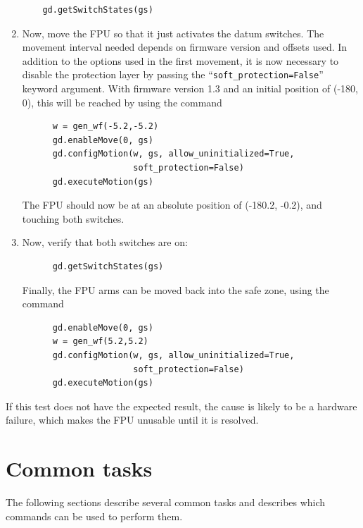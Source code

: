\documentclass[fontsize=12,a4paper]{scrreprt}
\begin{document}
\begin{enumerate}
  \begin{verbatim}
    gd.getSwitchStates(gs)
  \end{verbatim}

\item Now, move the FPU so that it just activates the datum
  switches. The movement interval needed depends on firmware version
  and offsets used.  In addition to the options used in the first
  movement, it is now necessary to disable the protection layer by
  passing the ``\texttt{soft\_protection=False}'' keyword argument.
  With firmware version 1.3 and an initial position of (-180, 0), this
  will be reached by using the command

    \begin{verbatim}
      w = gen_wf(-5.2,-5.2)
      gd.enableMove(0, gs)
      gd.configMotion(w, gs, allow_uninitialized=True,
                      soft_protection=False)
      gd.executeMotion(gs)
    \end{verbatim}

    The FPU should now be at an absolute position of (-180.2, -0.2), and
    touching both switches.

  \item Now, verify that both switches are on:
    \begin{verbatim}
      gd.getSwitchStates(gs)
    \end{verbatim}

    Finally, the FPU arms can be moved back into the safe zone, using
    the command
    \begin{verbatim}
      gd.enableMove(0, gs)
      w = gen_wf(5.2,5.2)
      gd.configMotion(w, gs, allow_uninitialized=True,
                      soft_protection=False)
      gd.executeMotion(gs)
    \end{verbatim}

\end{enumerate}

If this test does not have the expected result, the cause is likely to
be a hardware failure, which makes the FPU unusable until it is
resolved.

\chapter{Common tasks}
\label{sec:commontasks}

\minitoc

The following sections describe several common tasks
and describes which commands can be used to perform them.
\end{document}
